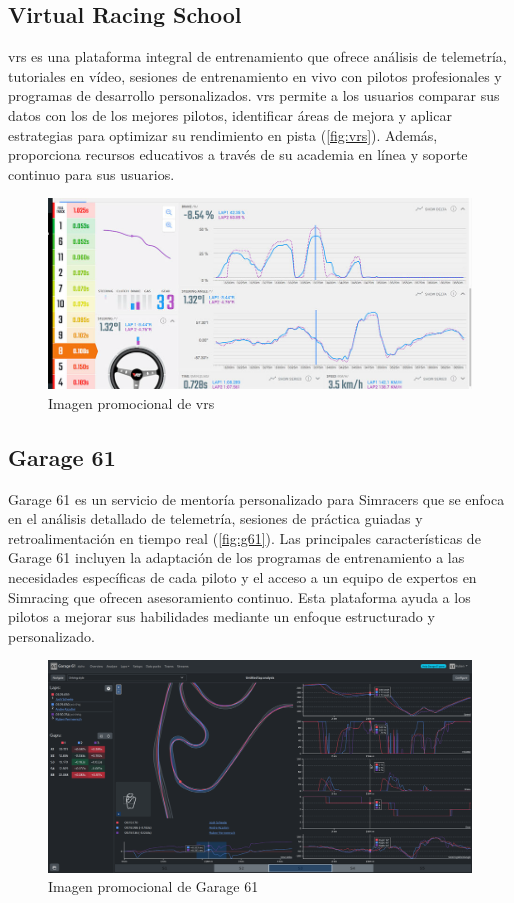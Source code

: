 \subsection{Virtual Racing School}
\ac{vrs} \cite{vrs} es una plataforma integral de entrenamiento que ofrece análisis de telemetría, tutoriales en vídeo, sesiones de entrenamiento en vivo con pilotos profesionales y programas de desarrollo personalizados. \ac{vrs} permite a los usuarios comparar sus datos con los de los mejores pilotos, identificar áreas de mejora y aplicar estrategias para optimizar su rendimiento en pista (\autoref{fig:vrs}). Además, proporciona recursos educativos a través de su academia en línea y soporte continuo para sus usuarios.
\begin{figure}[H]
	\centering
	\includegraphics[width=0.6\linewidth]{./figs/herramientas/mentor_virtual/vrs.png}
	\caption[Imagen promocional de \ac{vrs}]{Imagen promocional de \ac{vrs} \cite{vrs_cap}}
    \label{fig:vrs}
\end{figure}

\subsection{Garage 61}
Garage 61 \cite{g61} es un servicio de mentoría personalizado para Simracers que se enfoca en el análisis detallado de telemetría, sesiones de práctica guiadas y retroalimentación en tiempo real (\autoref{fig:g61}). Las principales características de Garage 61 incluyen la adaptación de los programas de entrenamiento a las necesidades específicas de cada piloto y el acceso a un equipo de expertos en Simracing que ofrecen asesoramiento continuo. Esta plataforma ayuda a los pilotos a mejorar sus habilidades mediante un enfoque estructurado y personalizado.
\begin{figure}[H]
	\centering
	\includegraphics[width=0.6\linewidth]{./figs/herramientas/mentor_virtual/garage61.png}
	\caption[Imagen promocional de Garage 61]{Imagen promocional de Garage 61 \cite{g61_cap}}
    \label{fig:g61}
\end{figure}

